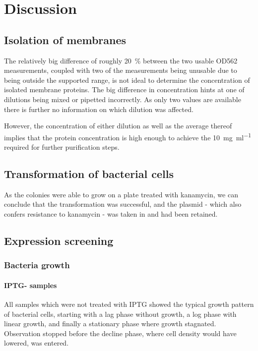 \documentclass[a4paper]{scrreprt}
\begin{document}
\chapter{Discussion}

\section{Isolation of membranes}

The relatively big difference of roughly \SI{20}{\percent} between the two
usable OD562 measurements, coupled with two of the measurements being unusable
due to being outside the supported range, is not ideal to determine the
concentration of isolated membrane proteins. The big difference in
concentration hints at one of dilutions being mixed or pipetted incorrectly. As
only two values are available there is further no information on which dilution
was affected.

However, the concentration of either dilution as well as the average thereof
implies that the protein concentration is high enough to achieve the
\SI{10}{\mg\per\ml} required for further purification steps.

\section{Transformation of bacterial cells}

As the colonies were able to grow on a plate treated with kanamycin, we can
conclude that the transformation was successful, and the plasmid - which also
confers resistance to kanamycin - was taken in and had been retained.

\section{Expression screening}

\subsection{Bacteria growth}

\subsubsection{IPTG- samples}

All samples which were not treated with IPTG showed the typical growth pattern
of bacterial cells, starting with a lag phase without growth, a log phase with
linear growth, and finally a stationary phase where growth stagnated.
Observation stopped before the decline phase, where cell density would have
lowered, was entered.
\end{document}
